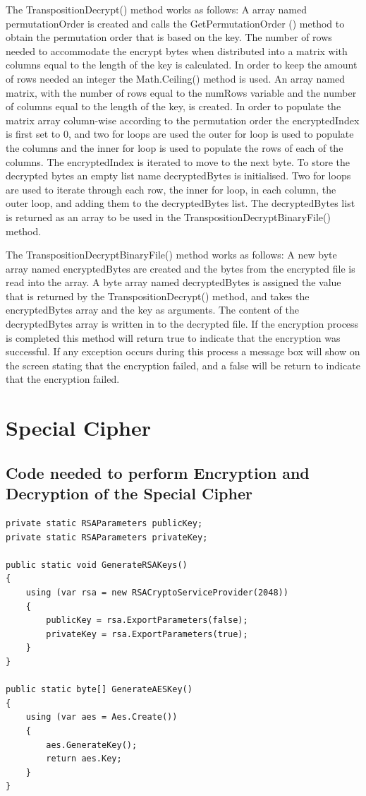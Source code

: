 \documentclass[a4paper,oneside,11pt]{book}
\begin{document}
The TranspositionDecrypt() method works as follows:
A array named permutationOrder is created and calls the GetPermutationOrder () method to obtain the permutation order that is based on the key. The number of rows needed to accommodate the encrypt bytes when distributed into a matrix with columns equal to the length of the key is calculated. In order to keep the amount of rows needed an integer the Math.Ceiling() method is used. An array named matrix, with the number of rows equal to the numRows variable and the number of columns equal to the length of the key, is created. In order to populate the matrix array column-wise according to the permutation order the encryptedIndex is first set to 0, and two for loops are used the outer for loop is used to populate the columns and the inner for loop is used to populate the rows of each of the columns. The encryptedIndex is iterated to move to the next byte. To store the decrypted bytes an empty list name decryptedBytes is initialised. Two for loops are used to iterate through each row, the inner for loop, in each column, the outer loop, and adding them to the decryptedBytes list. The decryptedBytes list is returned as an array to be used in the TranspositionDecryptBinaryFile() method.

The TranspositionDecryptBinaryFile() method works as follows:
A new byte array named encryptedBytes are created and the bytes from the encrypted file is read into the array. A byte array named decryptedBytes is assigned the value that is returned by the TranspositionDecrypt() method, and takes the encryptedBytes array and the key as arguments. The content of the decryptedBytes array is written in to the decrypted file. If the encryption process is completed this method will return true to indicate that the encryption was successful. If any exception occurs during this process a message box will show on the screen stating that the encryption failed, and a false will be return to indicate that the encryption failed.

\chapter[Special Cipher]{Special Cipher}

\section{Code needed to perform Encryption and Decryption of the Special Cipher}
\begin{lstlisting}[language=Csh, caption={Code for Special Cipher}]
private static RSAParameters publicKey;
private static RSAParameters privateKey;

public static void GenerateRSAKeys()
{
    using (var rsa = new RSACryptoServiceProvider(2048))
    {
        publicKey = rsa.ExportParameters(false);
        privateKey = rsa.ExportParameters(true);
    }
}

public static byte[] GenerateAESKey()
{
    using (var aes = Aes.Create())
    {
        aes.GenerateKey();
        return aes.Key;
    }
}
\end{lstlisting}
\end{document}
